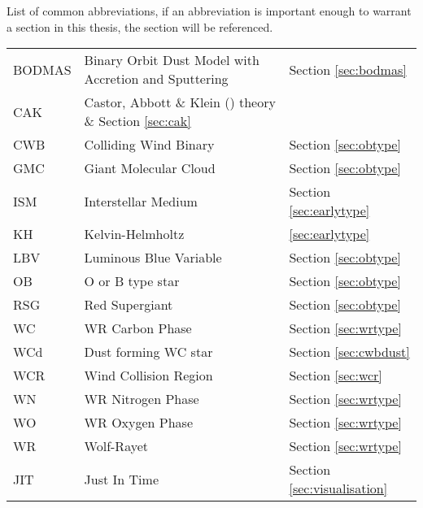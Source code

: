 \begin{abbreviations}
List of common abbreviations, if an abbreviation is important enough to warrant a section in this thesis, the section will be referenced.

\begin{table}[h]
  \centering
  \begin{tabular}{l|l|l}
    
    \hline

    BODMAS & Binary Orbit Dust Model with Accretion and Sputtering & Section \ref{sec:bodmas} \\
    CAK & Castor, Abbott \& Klein (\citeyear{castor_radiation-driven_1975}) theory \& Section \ref{sec:cak} \\
    CWB & Colliding Wind Binary  & Section \ref{sec:obtype} \\
    GMC & Giant Molecular Cloud & Section \ref{sec:obtype}\\
    ISM & Interstellar Medium & Section \ref{sec:earlytype} \\
    KH  & Kelvin-Helmholtz & \ref{sec:earlytype} \\ 
    LBV & Luminous Blue Variable & Section \ref{sec:obtype} \\
    OB  & O or B type star & Section \ref{sec:obtype} \\ 
    RSG & Red Supergiant & Section \ref{sec:obtype} \\
    WC  & WR Carbon Phase & Section \ref{sec:wrtype} \\
    WCd & Dust forming WC star & Section \ref{sec:cwbdust} \\
    WCR & Wind Collision Region & Section \ref{sec:wcr} \\
    WN  & WR Nitrogen Phase & Section \ref{sec:wrtype} \\
    WO  & WR Oxygen Phase & Section \ref{sec:wrtype} \\
    WR  & Wolf-Rayet & Section \ref{sec:wrtype} \\

    \hline

    JIT & Just In Time & Section \ref{sec:visualisation} \\

  \end{tabular} 
  \label{tbl:Abbreviations}
\end{table}



\end{abbreviations}
